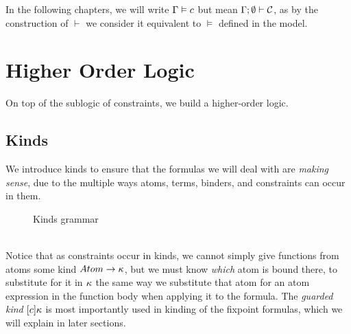 \documentclass[english, mgr]{iithesis}
\renewcommand{\it}[1]{\textit{#1}}
\newcommand{\solverRule}{\vdash}
\begin{document}
In the following chapters, we will write $\Gamma \vDash c$
but mean $\cEnv ; \emptyset \solverRule \sconstr$,
as by the construction of $\solverRule$ we consider it equivalent
to $\vDash$ defined in the model.
\chapter{Higher Order Logic}
On top of the sublogic of constraints, we build a higher-order logic.
\section{Kinds}
We introduce kinds to ensure that the formulas we will deal with
are \it{making sense},
due to the multiple ways atoms, terms, binders, and constraints can occur in them.
\begin{figure}[htbp]
  \caption{Kinds grammar}
  \label{fig:kinds-grammar}
\end{figure}
\\
Notice that as constraints occur in kinds, we cannot simply give functions
from atoms some kind ${Atom}\to\kappa$, but we must know \it{which} atom
is bound there, to substitute for it in $\kappa$ the same way we substitute
that atom for an atom expression in the function body when applying it to the formula.
The \it{guarded kind} $[c] \kappa$ is most importantly used in
kinding of the fixpoint formulas, which we will explain in later sections.
\end{document}
